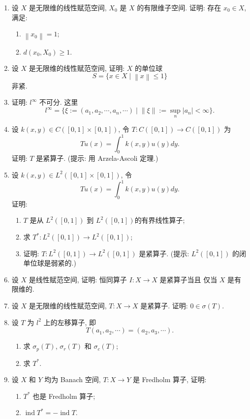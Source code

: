 \documentclass{ctexart}
\newcommand{\norm}[1]{\left\lVert#1\right\rVert}
\newcommand{\abs}[1]{\left\lvert#1\right\rvert}
\DeclareMathOperator{\ind}{ind}
\begin{document}
\begin{enumerate}
\item 设 $X$ 是无限维的线性赋范空间, $X_0$ 是 $X$ 的有限维子空间. 证明:
存在 $x_0 \in X$, 满足:
\begin{enumerate}
\item $\norm{x_0} = 1;$
\item $d(x_0, X_0) \geq 1.$
\end{enumerate}

\item 设 $X$ 是无限维的线性赋范空间, 证明: $X$ 的单位球
\[
S = \{x \in X \mid \norm{x} \leq 1\}
\]
非紧.

\item 证明: $l^\infty$ 不可分. 这里
\[
l^\infty = \{\xi := (a_1, a_2, \cdots, a_n, \cdots) \mid \norm{\xi} :=
\sup_n\abs{a_n} < \infty\}.
\]

\item 设 $k(x,y) \in C([0,1] \times [0,1])$, 令 $T : C([0,1]) \to
C([0,1])$ 为
\[
Tu(x) = \int_0^1k(x,y)u(y)dy.
\]
证明: $T$ 是紧算子. (提示: 用 Arzela-Ascoli 定理.)

\item 设 $k(x,y) \in L^2([0,1] \times [0,1])$, 令
\[
Tu(x) = \int_0^1k(x,y)u(y)dy.
\]
证明:
\begin{enumerate}
\item $T$ 是从 $L^2([0,1])$ 到 $L^2([0,1])$的有界线性算子;
\item 求 $T^* : L^2([0,1]) \to L^2([0,1])$;
\item 证明: $T : L^2([0,1]) \to L^2([0,1])$ 是紧算子. (提示:
  $L^2([0,1])$ 的闭单位球是弱紧的.)
\end{enumerate}

\item 设 $X$ 是线性赋范空间, 证明: 恒同算子 $I : X \to X$ 是紧算子当且
  仅当 $X$ 是有限维的.

\item 设 $X$ 是无限维的线性赋范空间, $T : X \to X$ 是紧算子. 证明: $0
  \in \sigma(T)$.

\item 设 $T$ 为 $l^2$ 上的左移算子, 即
\[
T(a_1, a_2, \cdots) = (a_2, a_3, \cdots).
\]
\begin{enumerate}
\item 求 $\sigma_p(T)$, $\sigma_r(T)$ 和 $\sigma_c(T)$;
\item 求 $T^*$.
\end{enumerate}

\item 设 $X$ 和 $Y$ 均为 Banach 空间, $T : X \to Y$ 是 Fredholm 算子,
  证明:
\begin{enumerate}
\item $T^*$ 也是 Fredholm 算子;
\item $\ind{T^*} = -\ind{T}$.
\end{enumerate}


\end{enumerate}
\end{document}
